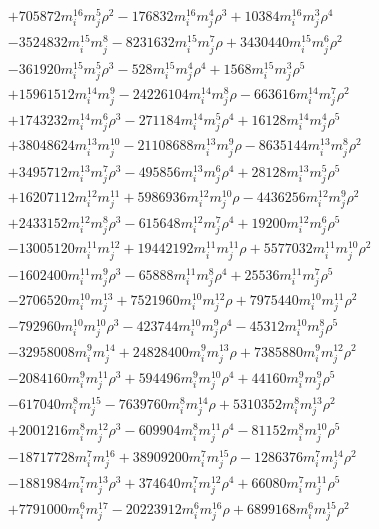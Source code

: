{\begin{align*}
&+705872m_i^{16}m_j^{5}\rho^{2}-176832m_i^{16}m_j^{4}\rho^{3}+10384m_i^{16}m_j^{3}\rho^{4}\\
&-3524832m_i^{15}m_j^{8}-8231632m_i^{15}m_j^{7}\rho+3430440m_i^{15}m_j^{6}\rho^{2}\\
&-361920m_i^{15}m_j^{5}\rho^{3}-528m_i^{15}m_j^{4}\rho^{4}+1568m_i^{15}m_j^{3}\rho^{5}\\
&+15961512m_i^{14}m_j^{9}-24226104m_i^{14}m_j^{8}\rho-663616m_i^{14}m_j^{7}\rho^{2}\\
&+1743232m_i^{14}m_j^{6}\rho^{3}-271184m_i^{14}m_j^{5}\rho^{4}+16128m_i^{14}m_j^{4}\rho^{5}\\
&+38048624m_i^{13}m_j^{10}-21108688m_i^{13}m_j^{9}\rho-8635144m_i^{13}m_j^{8}\rho^{2}\\
&+3495712m_i^{13}m_j^{7}\rho^{3}-495856m_i^{13}m_j^{6}\rho^{4}+28128m_i^{13}m_j^{5}\rho^{5}\\
&+16207112m_i^{12}m_j^{11}+5986936m_i^{12}m_j^{10}\rho-4436256m_i^{12}m_j^{9}\rho^{2}\\
&+2433152m_i^{12}m_j^{8}\rho^{3}-615648m_i^{12}m_j^{7}\rho^{4}+19200m_i^{12}m_j^{6}\rho^{5}\\
&-13005120m_i^{11}m_j^{12}+19442192m_i^{11}m_j^{11}\rho+5577032m_i^{11}m_j^{10}\rho^{2}\\
&-1602400m_i^{11}m_j^{9}\rho^{3}-65888m_i^{11}m_j^{8}\rho^{4}+25536m_i^{11}m_j^{7}\rho^{5}\\
&-2706520m_i^{10}m_j^{13}+7521960m_i^{10}m_j^{12}\rho+7975440m_i^{10}m_j^{11}\rho^{2}\\
&-792960m_i^{10}m_j^{10}\rho^{3}-423744m_i^{10}m_j^{9}\rho^{4}-45312m_i^{10}m_j^{8}\rho^{5}\\
&-32958008m_i^{9}m_j^{14}+24828400m_i^{9}m_j^{13}\rho+7385880m_i^{9}m_j^{12}\rho^{2}\\
&-2084160m_i^{9}m_j^{11}\rho^{3}+594496m_i^{9}m_j^{10}\rho^{4}+44160m_i^{9}m_j^{9}\rho^{5}\\
&-617040m_i^{8}m_j^{15}-7639760m_i^{8}m_j^{14}\rho+5310352m_i^{8}m_j^{13}\rho^{2}\\
&+2001216m_i^{8}m_j^{12}\rho^{3}-609904m_i^{8}m_j^{11}\rho^{4}-81152m_i^{8}m_j^{10}\rho^{5}\\
&-18717728m_i^{7}m_j^{16}+38909200m_i^{7}m_j^{15}\rho-1286376m_i^{7}m_j^{14}\rho^{2}\\
&-1881984m_i^{7}m_j^{13}\rho^{3}+374640m_i^{7}m_j^{12}\rho^{4}+66080m_i^{7}m_j^{11}\rho^{5}\\
&+7791000m_i^{6}m_j^{17}-20223912m_i^{6}m_j^{16}\rho+6899168m_i^{6}m_j^{15}\rho^{2}\\

\end{align*}}
